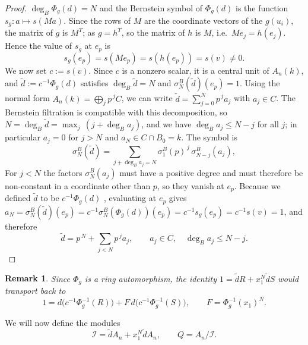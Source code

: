 \documentclass[pdflatex,sn-mathphys-num]{sn-jnl}
\numberwithin{equation}{section}
\theoremstyle{thmstyleone}
\theoremstyle{thmstyletwo}
\newtheorem{remark}[theorem]{Remark}
\begin{document}
\begin{proof}
$\deg_B\Phi_g(d)=N$ and the Bernstein symbol of $\Phi_g(d)$ is the
function $s_g\colon a\mapsto s(Ma)$. Since the rows of $M$ are the coordinate vectors of the $g(u_i)$, the matrix of
$g$ is $M^T$; as $g=h^T$, so the matrix of $h$ is $M$, i.e.\ $Me_j=h(e_j)$. Hence the
value of $s_g$ at $e_p$ is
\[ s_g(e_p) = s(Me_p)=s(h(e_p))=s(v)\neq0 .\]
We now set $c:=s(v)$. Since $c$ is a nonzero scalar, it is a central unit of
$A_n(k)$, and $\tilde d:=c^{-1}\Phi_g(d)$ satisfies $\deg_B\tilde d=N$ and
$\sigma_N^B(\tilde d)(e_p)=1$.
Using the normal form $A_n(k)=\bigoplus_j p^{\,j}C$, we can write
$\tilde d=\sum_{j = 0}^N p^{\,j}a_j$ with $a_j\in C$. The Bernstein filtration is
compatible with this decomposition, so
$N=\deg_B\tilde d=\max_j\,(j+\deg_B a_j)$, and we have $\deg_B a_j\le N-j$ for
all $j$; in particular $a_j=0$ for $j>N$ and $a_N\in C\cap B_0=k$. 
The symbol is
\[
  \sigma_N^B(\tilde d)=\sum_{j+\deg_B a_j=N}\sigma_1^B(p)^{\,j}\,\sigma_{N-j}^B(a_j),
\]
For $j<N$ the factors $\sigma_N^B(a_j)$ must have a positive degree and must therefore be non-constant in a coordinate other than $p$, so they vanish at $e_p$. Because we defined $\tilde d$ to be $c^{-1}\Phi_g(d)$ , evaluating at $e_p$ gives $a_N=\sigma_N^B(\tilde d)(e_p)=c^{-1}\sigma_N^B(\Phi_g(d))(e_p) = c^{-1}s_g(e_p) = c^{-1}s(v)=1$, and therefore
\[ \tilde d=p^{\,N}+\sum_{j<N}p^{\,j}a_j,\qquad a_j\in C,\quad
  \deg_B a_j\le N-j. \]
\end{proof}



\begin{remark}\label{rem:transport}
Since $\Phi_g$ is a ring automorphism, the identity $1=\tilde dR+x_1^N\tilde dS$ would transport back to
\[ 1=d\bigl(c^{-1}\Phi_g^{-1}(R)\bigr)+F\,d\bigl(c^{-1}\Phi_g^{-1}(S)\bigr),
  \qquad F=\Phi_g^{-1}(x_1)^N.\]
\end{remark}


We will now define the modules
\begin{equation} \mathcal I=\tilde dA_n+x_1^N\tilde dA_n,\qquad Q=A_n/\mathcal I.
 \label{eq:I-Q}\end{equation}
\end{document}
